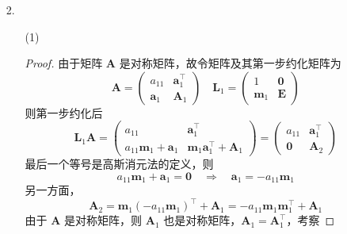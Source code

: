 \documentclass{sjtuarticle}
\begin{document}
\begin{itemize}
\begin{solution}
\begin{itemize}
        \end{itemize}
    \end{solution}
    \item[2.] \begin{itemize}
        \item[(1)] \begin{proof}
            由于矩阵 $\bm{A}$ 是对称矩阵，故令矩阵及其第一步约化矩阵为
            \begin{equation*}
                \bm{A}=
                \begin{pmatrix}
                    a_{11} & \bm{a}_{1}^\top \\
                    \bm{a}_1 & \bm{A}_1
                \end{pmatrix} \quad
                \bm{L}_1=
                \begin{pmatrix}
                    1 & \bm{0} \\
                    \bm{m}_1 & \bm{E} 
                \end{pmatrix}
            \end{equation*}
            则第一步约化后
            \begin{equation*}
                \bm{L}_1\bm{A}=\begin{pmatrix}
                    a_{11} & \bm{a}_1^\top \\
                    a_{11}\bm{m}_1+\bm{a}_1 & \bm{m}_1\bm{a}_1^\top+\bm{A}_1
                \end{pmatrix}=\begin{pmatrix}
                    a_{11} & \bm{a}_1^\top \\
                    \bm{0} & \bm{A}_2
                \end{pmatrix}
            \end{equation*}
            最后一个等号是高斯消元法的定义，则
            \begin{equation}\label{eq:gdef}
                a_{11}\bm{m}_1+\bm{a}_1=\bm{0} \quad \Rightarrow \quad  \bm{a}_1=-a_{11}\bm{m}_1 %
            \end{equation}
            另一方面，
            \begin{equation*}
                \bm{A}_2=\bm{m}_1(-a_{11}\bm{m}_1)^\top+\bm{A}_1=-a_{11}\bm{m}_1\bm{m}_1^\top+\bm{A}_1%
            \end{equation*}
            由于 $\bm{A}$ 是对称矩阵，则 $\bm{A}_1$ 也是对称矩阵，$\bm{A}_1=\bm{A}_1^\top$，考察

\end{proof}
\end{itemize}
\end{itemize}
\end{document}
